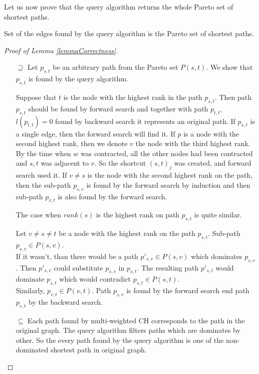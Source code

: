 Let us now prove that the query algorithm returns the whole Pareto set of shortest paths.

\begin{lemma}\label{lemmaCorrectness}
Set of the edges found by the query algorithm is the Pareto set of shortest paths.
\end{lemma}
\begin{proof}[Proof of Lemma \ref{lemmaCorrectness}]
\ \\ 
\begin{itemize}
\item[$\supseteq$] 
    Let $p_{s,t}$ be an arbitrary path from the Pareto set $P(s,t)$. We show that $p_{s,t}$ is found by the query algorithm. 

Suppose that $t$ is the node with the highest rank in the path $p_{s,t}$. 
Then path $p_{s,t}$ should be found by forward search
and together with path $p_{t,t}$, $l(p_{t,t})=0$ 
found by backward search it represents an original path.
If $p_{s,t}$ is a single edge, then the forward search will find it.
If $p$ is a node with the second highest rank, then we denote $v$ the
node with the third highest rank. 
By the time when $w$ was contracted, all the other nodes had been contracted
and $s,t$ was adjacent to $v$. So the shortcut $(s,t)_j$ was created, and forward search used it.
If $v \ne s$ is the node with the second highest rank on the path,
then the sub-path $p_{s,v}$ is found by the forward search by induction and
then sub-path $p_{v,t}$ is also found by the forward search.

The case when $rank(s)$ is the highest rank on path $p_{s,t}$ is quite similar. 

Let $v \ne s \ne t$ be a node with the highest rank on the path $p_{s,t}$. 
Sub-path $p_{s,v} \in P(s,v)$.\\ 
If it wasn't, than there would be a path $p'_{s,v} \in P(s,v)$ which dominates $p_{s,v}$. 
Then $p'_{s,v}$ could substitute $p_{s,v}$ in $p_{s,t}$. The resulting path $p'_{s,t}$ 
would dominate $p_{s,t}$ which would contradict $p_{s,t} \in P(s,t)$.\\
Similarly, $p_{v,t} \in P(v,t) $. Path $p_{s,v}$ is found by the forward search end path
$p_{v,t}$ by the backward search.
\item[$\subseteq$] 
Each path found by multi-weighted CH corresponds to the path in the original graph. 
The query algorithm filters paths which are dominates by other. So the every path
found by the query algorithm is one of the non-dominated shortest path in original graph.
\end{itemize}
\end{proof}

